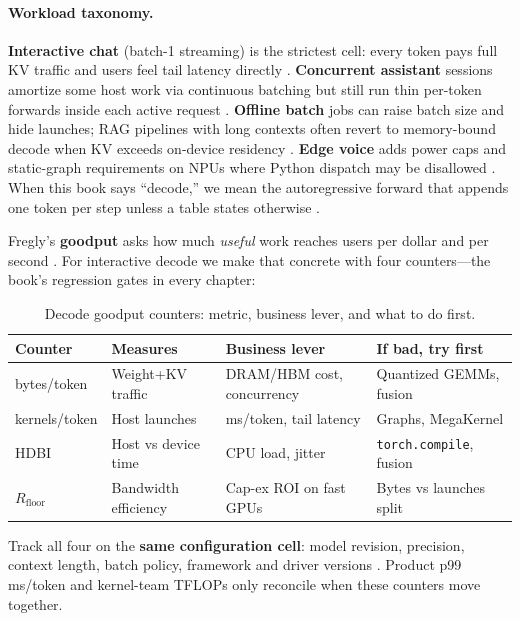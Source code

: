 \paragraph{Workload taxonomy.}
\textbf{Interactive chat} (batch-1 streaming) is the strictest cell: every token pays full KV traffic and users feel tail latency directly \citep{fan2025ellieenergyefficie}.
\textbf{Concurrent assistant} sessions amortize some host work via continuous batching but still run thin per-token forwards inside each active request \citep{kwon2023vllm}.
\textbf{Offline batch} jobs can raise batch size and hide launches; RAG pipelines with long contexts often revert to memory-bound decode when KV exceeds on-device residency \citep{li2024llminferenceservin}.
\textbf{Edge voice} adds power caps and static-graph requirements on NPUs where Python dispatch may be disallowed \citep{amd2024aie,amd2024xdna}.
When this book says ``decode,'' we mean the autoregressive forward that appends one token per step unless a table states otherwise \citep{wang2025decoupledanalysiso}.


Fregly's \textbf{goodput} asks how much \emph{useful} work reaches users per dollar and per second \citep{patel2025llminference}.
For interactive decode we make that concrete with four counters---the book's regression gates in every chapter:

\begin{table}[t]
\centering
\caption{Decode goodput counters: metric, business lever, and what to do first.}
\label{tab:goodput_map}
\small
\begin{tabular}{@{}p{1.1in}p{1.2in}p{1.55in}p{1.55in}@{}}
\toprule
\textbf{Counter} & \textbf{Measures} & \textbf{Business lever} & \textbf{If bad, try first} \\
\midrule
bytes/token & Weight+KV traffic & DRAM/HBM cost, concurrency & Quantized GEMMs, fusion \\
kernels/token & Host launches & ms/token, tail latency & Graphs, MegaKernel \\
HDBI & Host vs device time & CPU load, jitter & \texttt{torch.compile}, fusion \\
$R_{\mathrm{floor}}$ & Bandwidth efficiency & Cap-ex ROI on fast GPUs & Bytes vs launches split \\
\bottomrule
\end{tabular}
\end{table}

Track all four on the \textbf{same configuration cell}: model revision, precision, context length, batch policy, framework and driver versions \citep{taxbreak2026,memoryfloor2026}.
Product p99 ms/token and kernel-team TFLOPs only reconcile when these counters move together.

